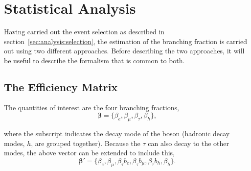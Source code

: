 \section{Statistical Analysis}
\label{sec:analysis:method}



Having carried out the event selection as described in
section~\ref{sec:analysis:selection}, the estimation of the \PW branching fraction
is carried out using two different approaches.  Before describing the
two approaches, it will be useful to describe the formalism that is
common to both.



\subsection{The Efficiency Matrix}


The quantities of interest are the four \PW branching fractions,
\begin{equation}
    \boldsymbol{\beta} = \{\beta_{e}, \beta_{\mu}, \beta_{\tau}, \beta_{h}\},
\end{equation}

\noindent
where the subscript indicates the decay mode of the \PW boson (hadronic
decay modes, $h$, are grouped together).  Because the $\tau$ can also
decay to the other modes, the above vector can be extended to include
this,
\begin{equation}
    \boldsymbol{\beta'} = \{\beta_{e}, \beta_{\mu}, \beta_{\tau}b_{e},
    \beta_{\tau}b_{\mu}, \beta_{\tau}b_{h}, \beta_{h}\}.
\end{equation}


